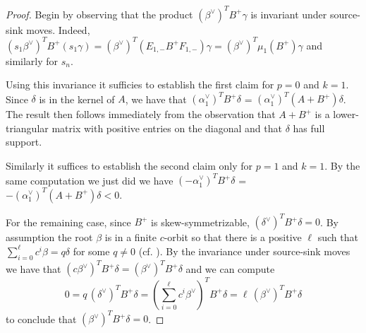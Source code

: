 \documentclass{amsart}
\numberwithin{theorem}{section}
\begin{document}
  \begin{proof}
    Begin by observing that the product $(\beta^\vee)^T B^+ \gamma$ is invariant under source-sink moves.
    Indeed, $(s_1\beta^\vee)^T B^+ (s_1\gamma) = (\beta^\vee)^T (E_{1,-} B^+ F_{1,-}) \gamma = (\beta^\vee)^T \mu_1(B^+) \gamma$ and similarly for $s_n$.

    Using this invariance it sufficies to establish the first claim for $p=0$ and $k=1$.
    Since $\delta$ is in the kernel of $A$, we have that $(\alpha_1^\vee)^T B^+ \delta$ = $(\alpha_1^\vee)^T (A+B^+) \delta$.
    The result then follows immediately from the observation that $A + B^+$ is a lower-triangular matrix with positive entries on the diagonal and that $\delta$ has full support.

    Similarly it suffices to establish the second claim only for $p=1$ and $k=1$.
    By the same computation we just did we have $(-\alpha_1^\vee)^T B^+ \delta$ = $-(\alpha_1^\vee)^T (A+B^+) \delta <0$.

    For the remaining case, since $B^+$ is skew-symmetrizable, $(\delta^\vee)^T B^+ \delta = 0$.
    By assumption the root $\beta$ is in a finite $c$-orbit so that there is a positive $\ell$ such that $\sum_{i=0}^\ell c^i \beta = q \delta$ for some $q\neq 0$ (cf. \cite{afforb}).
    By the invariance under source-sink moves we have that $(c\beta^\vee)^T B^+ \delta = (\beta^\vee)^T B^+ \delta$ and we can compute
    \[
      0 = q\, (\delta^\vee)^T B^+ \delta = \left(\sum_{i=0}^\ell c^i \beta^\vee\right)^T B^+ \delta = \ell\, (\beta^\vee)^T B^+ \delta
    \]
  to conclude that $(\beta^\vee)^T B^+ \delta = 0$.
  \end{proof}
\end{document}
